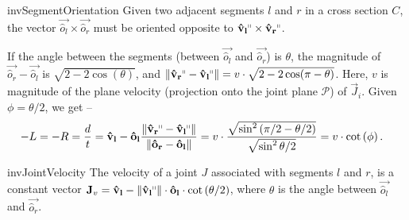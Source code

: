 \begin{restatable}{inv}{SegmentOrientation}
\label{inv:SegmentOrientation}
Given two adjacent segments $l$ and $r$ in a cross section $C$, the vector
$\vec{\hat o_l}\times \vec{\hat o_r}$ must be oriented opposite to $\vec{\hat v_l}^\shortparallel\times \vec{\hat v_r}^\shortparallel$.
\end{restatable}

If the angle between the segments (between $\vec{\hat o_l}$ and $\vec{\hat o_r}$) is $\theta$,
the magnitude of $\vec{\hat o_r}-\vec{\hat o_l}$ is $\sqrt{2-2\cos(\theta)}$,
and $ \left\| \vec{\hat v_r}^\shortparallel-\vec{\hat v_l}^\shortparallel\right\| = v\cdot\sqrt{2-2\cos(\pi-\theta)}$.
Here, $v$ is magnitude of the plane velocity (projection onto the joint plane
$\mathcal P$) of $\vec J_i$.
Given $\phi = \theta/2$, we get --
\begin{align*}
-L = -R &= \frac dt = \vec{\hat v_l} - \vec{\hat o_l}\frac{ \left\| \vec{\hat v_r}^\shortparallel
- \vec{\hat v_l}^\shortparallel\right\|}{ \left\| \vec{\hat o_r}-\vec{\hat o_l}\right\|}
= v\cdot\frac{\sqrt{\sin^2\left( {\pi/2-\theta/2}\right)}}{\sqrt{\sin^2{\theta/2}}}
= v\cdot\cot\left( \phi \right).
\end{align*}

\begin{restatable}{inv}{JointVelocity}
\label{inv:joint_velocity}
The velocity of a joint $J$ associated with segments $l$ and $r$, is a constant vector
$\vec J_v
= \vec{\hat v_l} - \left\| \vec{\hat v_l}^\shortparallel\right\|\cdot\vec{\hat o_l}\cdot\cot\left( \theta/2 \right)$,
where $\theta$ is the angle between $\vec{\hat o_l}$ and $\vec{\hat o_r}$.
\end{restatable}


